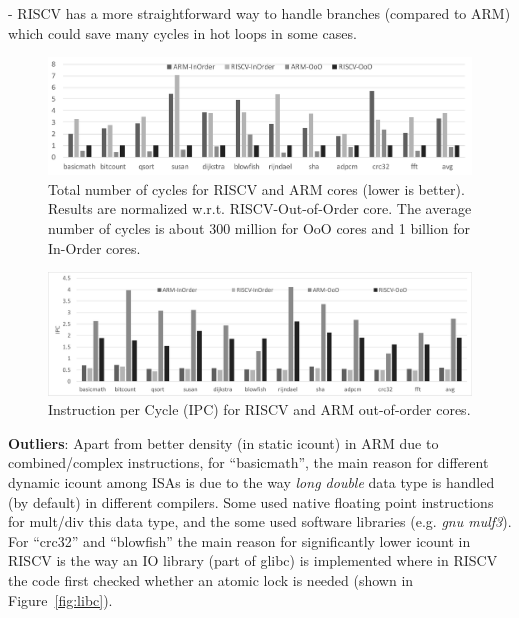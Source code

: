 - RISCV has a more straightforward way to handle branches (compared to ARM) which could save many cycles in hot loops in some cases. 



\begin{figure}[htb]
	\centering
	\includegraphics[width=1.9\columnwidth]{figures/cyc.pdf}
	\caption{Total number of cycles for RISCV and ARM cores (lower is better). Results are normalized w.r.t. RISCV-Out-of-Order core. The average number of cycles is about 300 million for OoO cores and 1 billion for In-Order cores.}
	\label{fig:totCyc}
\end{figure} 

\begin{figure}[]
	\centering
	\includegraphics[width=1.8\columnwidth]{figures/ipc.pdf}
	\caption{Instruction per Cycle (IPC) for RISCV and ARM out-of-order cores.}
	\label{fig:ipc}
	\vspace{-1em}
\end{figure} 





\noindent \textbf{Outliers}: Apart from better density (in static icount) in ARM due to combined/complex instructions, for ``basicmath'', the main reason for different dynamic icount among ISAs is due to the way \textit{long double} data type is handled (by default) in different compilers. Some used native floating point instructions for mult/div this data type, and the some used software libraries (e.g. \textit{gnu mulf3}). For ``crc32'' and ``blowfish'' the main reason for significantly lower icount in RISCV is the way an IO library (part of glibc) is implemented where in RISCV the code first checked whether an atomic lock is needed (shown in Figure~\ref{fig:libc}). 



